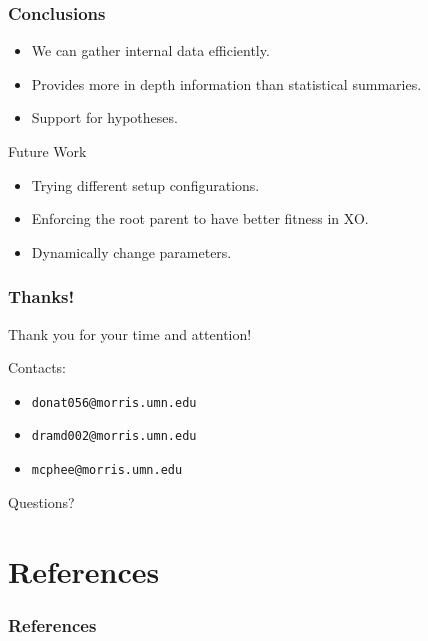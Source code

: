 \documentclass{beamer}
\newcommand{\linespace}{\vskip 0.25cm}
\begin{document}
\begin{frame}
\frametitle{Conclusions}

\begin{itemize}
\item We can gather internal data efficiently.
\item Provides more in depth information than statistical summaries. 
\item Support for hypotheses.
\end{itemize}
\linespace
\linespace
\linespace
\linespace

Future Work
\begin{itemize}
\item Trying different setup configurations.
\item Enforcing the root parent to have better fitness in XO.
\item Dynamically change parameters.
\end{itemize}
\end{frame}

\begin{frame}
	\frametitle{Thanks!}
	
	Thank you for your time and attention!
		
	\linespace
	\linespace
	
	Contacts:  
	\begin{itemize}
		\item \texttt{donat056@morris.umn.edu}
		\item \texttt{dramd002@morris.umn.edu}
		\item \texttt{mcphee@morris.umn.edu}
	\end{itemize}
	
	\linespace
	\linespace
	
	\begin{center}
	{\huge Questions?}
	\end{center}
\end{frame}

\section*{References}

\begin{frame} 
\frametitle{References}
\nocite{*}

{\tiny }
\end{frame} 
\end{document}
